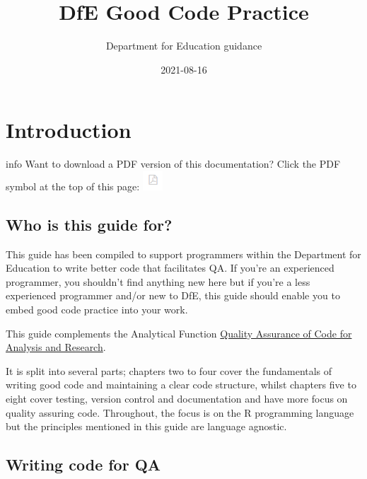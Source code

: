 \documentclass[
]{book}
\title{DfE Good Code Practice}
\author{Department for Education guidance}
\date{2021-08-16}
\begin{document}
\maketitle

{
\setcounter{tocdepth}{1}
\tableofcontents
}
\hypertarget{introduction}{%
\chapter{Introduction}\label{introduction}}

\begin{infoboxblue}info
Want to download a PDF version of this documentation? Click the PDF symbol at the top of this page: \includegraphics{pictures/pdf-pic.png}

\end{infoboxblue}

\hypertarget{who-is-this-guide-for}{%
\section{Who is this guide for?}\label{who-is-this-guide-for}}

This guide has been compiled to support programmers within the Department for Education to write better code that facilitates QA. If you're an experienced programmer, you shouldn't find anything new here but if you're a less experienced programmer and/or new to DfE, this guide should enable you to embed good code practice into your work.

This guide complements the Analytical Function \href{https://best-practice-and-impact.github.io/qa-of-code-guidance}{Quality Assurance of Code for Analysis and Research}.

It is split into several parts; chapters two to four cover the fundamentals of writing good code and maintaining a clear code structure, whilst chapters five to eight cover testing, version control and documentation and have more focus on quality assuring code. Throughout, the focus is on the R programming language but the principles mentioned in this guide are language agnostic.

\hypertarget{writing-code-for-qa}{%
\section{Writing code for QA}\label{writing-code-for-qa}}
\end{document}
